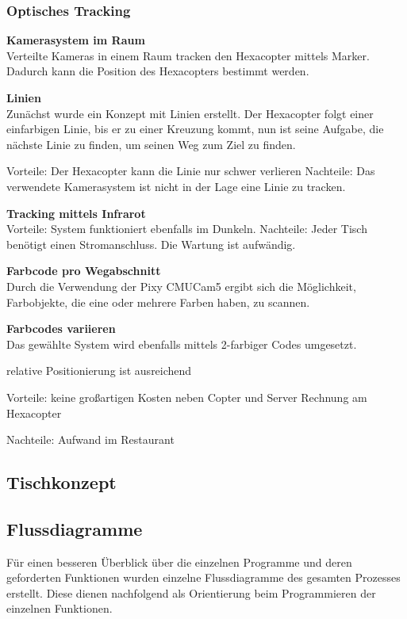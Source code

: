 \begin{itemize}
    \subsubsection{Optisches Tracking}


      \textbf{Kamerasystem im Raum}\\
      Verteilte Kameras in einem Raum tracken den Hexacopter mittels Marker. Dadurch kann die Position des Hexacopters bestimmt werden.


      \textbf{Linien}\\
      Zunächst wurde ein Konzept mit Linien erstellt. Der Hexacopter folgt einer einfarbigen Linie, bis er zu einer Kreuzung kommt, nun ist seine Aufgabe, die nächste Linie zu finden, um seinen Weg zum Ziel zu finden.

      Vorteile: Der Hexacopter kann die Linie nur schwer verlieren
      Nachteile: Das verwendete Kamerasystem ist nicht in der Lage eine Linie zu tracken.

      \textbf{Tracking mittels Infrarot}\\


      Vorteile:
      System funktioniert ebenfalls im Dunkeln.
      Nachteile:
      Jeder Tisch benötigt einen Stromanschluss.
      Die Wartung ist aufwändig.

      \textbf{Farbcode pro Wegabschnitt}\\
      Durch die Verwendung der Pixy CMUCam5 ergibt sich die Möglichkeit, Farbobjekte, die eine oder mehrere Farben haben, zu scannen.



      \textbf{Farbcodes variieren}\\
      Das gewählte System wird ebenfalls mittels 2-farbiger Codes umgesetzt.


      relative Positionierung ist ausreichend

      Vorteile:
      keine großartigen Kosten neben Copter und Server
      Rechnung am Hexacopter

      Nachteile:
      Aufwand im Restaurant



  \subsection{Tischkonzept}



  \subsection{Flussdiagramme}
  Für einen besseren Überblick über die einzelnen Programme und deren geforderten Funktionen wurden einzelne Flussdiagramme des gesamten Prozesses erstellt.
  Diese dienen nachfolgend als Orientierung beim Programmieren der einzelnen Funktionen.


\end{itemize}

